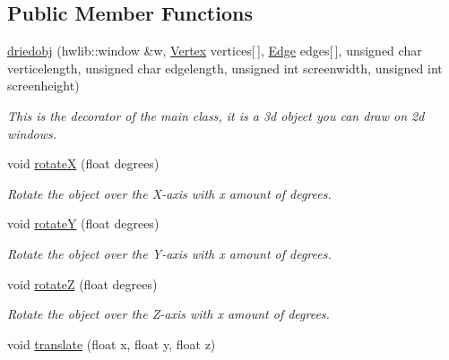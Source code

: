 \subsection*{Public Member Functions}
\begin{DoxyCompactItemize}
\item 
\hyperlink{classdriedobj_afb127c8b8fb3eeccac0b10223058a454}{driedobj} (hwlib\+::window \&w, \hyperlink{structVertex}{Vertex} vertices\mbox{[}$\,$\mbox{]}, \hyperlink{structEdge}{Edge} edges\mbox{[}$\,$\mbox{]}, unsigned char verticelength, unsigned char edgelength, unsigned int screenwidth, unsigned int screenheight)
\begin{DoxyCompactList}\small\item\em This is the decorator of the main class, it is a 3d object you can draw on 2d windows. \end{DoxyCompactList}\item 
\hypertarget{classdriedobj_a7f650e57daea2e35095554131718d088}{void \hyperlink{classdriedobj_a7f650e57daea2e35095554131718d088}{rotate\+X} (float degrees)}\label{classdriedobj_a7f650e57daea2e35095554131718d088}

\begin{DoxyCompactList}\small\item\em Rotate the object over the X-\/axis with x amount of degrees. \end{DoxyCompactList}\item 
\hypertarget{classdriedobj_a7ec55d1803e85e6dab3fe23c9f387d98}{void \hyperlink{classdriedobj_a7ec55d1803e85e6dab3fe23c9f387d98}{rotate\+Y} (float degrees)}\label{classdriedobj_a7ec55d1803e85e6dab3fe23c9f387d98}

\begin{DoxyCompactList}\small\item\em Rotate the object over the Y-\/axis with x amount of degrees. \end{DoxyCompactList}\item 
\hypertarget{classdriedobj_a7d23752e964832477cc266605ee4234f}{void \hyperlink{classdriedobj_a7d23752e964832477cc266605ee4234f}{rotate\+Z} (float degrees)}\label{classdriedobj_a7d23752e964832477cc266605ee4234f}

\begin{DoxyCompactList}\small\item\em Rotate the object over the Z-\/axis with x amount of degrees. \end{DoxyCompactList}\item 
\hypertarget{classdriedobj_a1dd0bfeb6d88453a057f759b7f969bbe}{void \hyperlink{classdriedobj_a1dd0bfeb6d88453a057f759b7f969bbe}{translate} (float x, float y, float z)}\label{classdriedobj_a1dd0bfeb6d88453a057f759b7f969bbe}


\end{DoxyCompactItemize}
